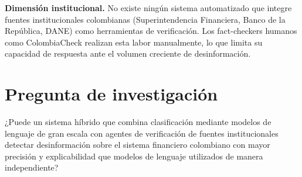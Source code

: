 \textbf{Dimensión institucional.} No existe ningún sistema automatizado que integre fuentes institucionales colombianas (Superintendencia Financiera, Banco de la República, DANE) como herramientas de verificación. Los fact-checkers humanos como ColombiaCheck realizan esta labor manualmente, lo que limita su capacidad de respuesta ante el volumen creciente de desinformación.

\section{Pregunta de investigación}

¿Puede un sistema híbrido que combina clasificación mediante modelos de lenguaje de gran escala con agentes de verificación de fuentes institucionales detectar desinformación sobre el sistema financiero colombiano con mayor precisión y explicabilidad que modelos de lenguaje utilizados de manera independiente?
